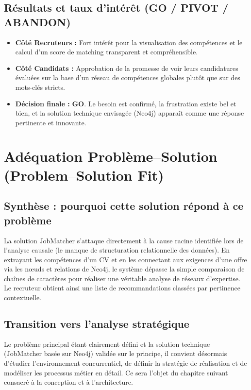\documentclass[12pt,a4paper]{report}
\begin{document}
\subsection{Résultats et taux d'intérêt (GO / PIVOT / ABANDON)}
\begin{itemize}
    \item \textbf{Côté Recruteurs :} Fort intérêt pour la visualisation des compétences et le calcul d'un score de matching transparent et compréhensible.
    \item \textbf{Côté Candidats :} Approbation de la promesse de voir leurs candidatures évaluées sur la base d'un réseau de compétences globales plutôt que sur des mots-clés stricts.
    \item \textbf{Décision finale :} \textbf{GO}. Le besoin est confirmé, la frustration existe bel et bien, et la solution technique envisagée (Neo4j) apparaît comme une réponse pertinente et innovante.
\end{itemize}

\section{Adéquation Problème–Solution (Problem–Solution Fit)}

\subsection{Synthèse : pourquoi cette solution répond à ce problème}
La solution JobMatcher s'attaque directement à la cause racine identifiée lors de l'analyse causale (le manque de structuration relationnelle des données). En extrayant les compétences d'un CV et en les connectant aux exigences d'une offre via les nœuds et relations de Neo4j, le système dépasse la simple comparaison de chaînes de caractères pour réaliser une véritable analyse de réseaux d'expertise. Le recruteur obtient ainsi une liste de recommandations classées par pertinence contextuelle.

\subsection{Transition vers l'analyse stratégique}
Le problème principal étant clairement défini et la solution technique (JobMatcher basée sur Neo4j) validée sur le principe, il convient désormais d'étudier l'environnement concurrentiel, de définir la stratégie de réalisation et de modéliser les processus métier en détail. Ce sera l'objet du chapitre suivant consacré à la conception et à l'architecture.
\end{document}
